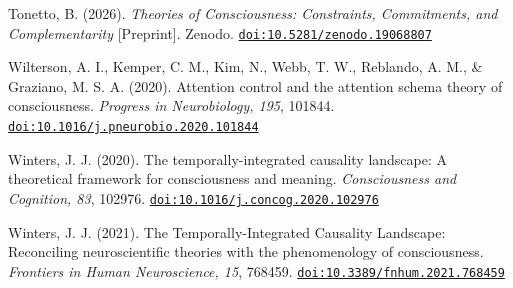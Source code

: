 \documentclass[
  11pt,
  a4paper,
]{article}
\begin{document}
Tonetto, B. (2026). \emph{Theories of Consciousness: Constraints,
Commitments, and Complementarity} {[}Preprint{]}. Zenodo.
\href{https://doi.org/10.5281/zenodo.19068807}{\nolinkurl{doi:10.5281/zenodo.19068807}}

Wilterson, A. I., Kemper, C. M., Kim, N., Webb, T. W., Reblando, A. M.,
\& Graziano, M. S. A. (2020). Attention control and the attention schema
theory of consciousness. \emph{Progress in Neurobiology, 195}, 101844.
\href{https://doi.org/10.1016/j.pneurobio.2020.101844}{\nolinkurl{doi:10.1016/j.pneurobio.2020.101844}}

Winters, J. J. (2020). The temporally-integrated causality landscape: A
theoretical framework for consciousness and meaning. \emph{Consciousness
and Cognition, 83}, 102976.
\href{https://doi.org/10.1016/j.concog.2020.102976}{\nolinkurl{doi:10.1016/j.concog.2020.102976}}

Winters, J. J. (2021). The Temporally-Integrated Causality Landscape:
Reconciling neuroscientific theories with the phenomenology of
consciousness. \emph{Frontiers in Human Neuroscience, 15}, 768459.
\href{https://doi.org/10.3389/fnhum.2021.768459}{\nolinkurl{doi:10.3389/fnhum.2021.768459}}
\end{document}
